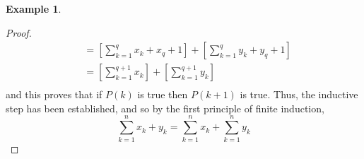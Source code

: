 \documentclass{book}
\theoremstyle{definition}
\newtheorem{example}[theorem]{Example}
\begin{document}
\begin{example}
\begin{proof}
\begin{align*}
                    & =  \left [ \sum_{k=1}^{q}{x_k} + x_q+1 \right ]  + \left [ \sum_{k=1}^{q}{y_k} + y_q+1 \right ] \\
                    & =  \left [ \sum_{k=1}^{q+1}{x_k} \right ]  + \left [ \sum_{k=1}^{q+1}{y_k} \right ] \\
            \end{align*}
        and this proves that if $P(k)$ is true then $P(k+1)$ is true. Thus, the inductive step has been established, and so by the first principle of finite induction,
            \begin{equation*}
                 \sum_{k=1}^{n}{x_k + y_k} = \sum_{k=1}^{n}{x_k} + \sum_{k=1}^{n}{y_k} 
            \end{equation*}
    \end{proof}
\end{example}
\end{document}
